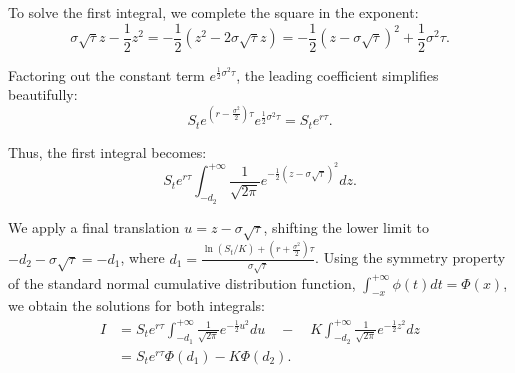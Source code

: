 \documentclass{article}
\theoremstyle{definition}
\theoremstyle{remark}
\begin{document}
To solve the first integral, we complete the square in the exponent:
\begin{equation*}
    \sigma\sqrt{\tau} z - \frac{1}{2}z^2 = -\frac{1}{2}(z^2 - 2\sigma\sqrt{\tau} z) = -\frac{1}{2}(z - \sigma\sqrt{\tau})^2 + \frac{1}{2}\sigma^2\tau.
\end{equation*}

Factoring out the constant term $e^{\frac{1}{2}\sigma^2\tau}$, the leading coefficient simplifies beautifully:
\begin{equation*}
    S_t e^{\left(r - \frac{\sigma^2}{2}\right)\tau} e^{\frac{1}{2}\sigma^2\tau} = S_t e^{r\tau}.
\end{equation*}

Thus, the first integral becomes:
\begin{equation*}
    S_t e^{r\tau} \int_{-d_2}^{+\infty} \frac{1}{\sqrt{2\pi}} e^{-\frac{1}{2}(z - \sigma\sqrt{\tau})^2} dz.
\end{equation*}

We apply a final translation $u = z - \sigma\sqrt{\tau}$, shifting the lower limit to $-d_2 - \sigma\sqrt{\tau} = -d_1$, where $d_1 = \frac{\ln(S_t/K) + (r + \frac{\sigma^2}{2})\tau}{\sigma\sqrt{\tau}}$. Using the symmetry property of the standard normal cumulative distribution function, $\int_{-x}^{+\infty} \phi(t) dt = \Phi(x)$, we obtain the solutions for both integrals:
\begin{align*}
    I &= S_t e^{r\tau} \int_{-d_1}^{+\infty} \frac{1}{\sqrt{2\pi}} e^{-\frac{1}{2}u^2} du \quad - \quad K \int_{-d_2}^{+\infty} \frac{1}{\sqrt{2\pi}} e^{-\frac{1}{2}z^2} dz \\
    &= S_t e^{r\tau} \Phi(d_1) - K \Phi(d_2).
\end{align*}




\nocite{*}
\newpage
\printbibliography[heading=bibintoc, title={Bibliography}]
\end{document}
